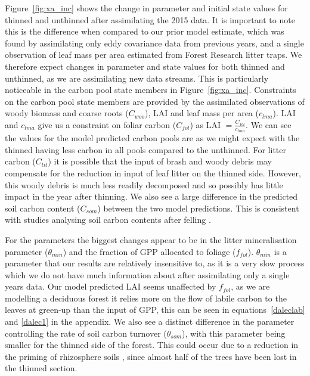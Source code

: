 \documentclass[draft,linenumbers]{agujournal}
\begin{document}
Figure~\ref{fig:xa_inc} shows the change in parameter and initial state values for thinned and unthinned after assimilating the 2015 data. It is important to note this is the difference when compared to our prior model estimate, which was found by assimilating only eddy covariance data from previous years, and a single observation of leaf mass per area estimated from Forest Research litter traps. We therefore expect changes in parameter and state values for both thinned and unthinned, as we are assimilating new data streams. This is particularly noticeable in the carbon pool state members in Figure~\ref{fig:xa_inc}. Constraints on the carbon pool state members are provided by the assimilated observations of woody biomass and coarse roots (\(C_{woo}\)), LAI and leaf mass per area (\(c_{lma}\)). LAI and \(c_{lma}\) give us a constraint on foliar carbon (\(C_{fol}\)) as LAI \(= \frac{C_{fol}}{c_{lma}} \). We can see the values for the model predicted carbon pools are as we might expect with the thinned having less carbon in all pools compared to the unthinned. For litter carbon (\(C_{lit}\)) it is possible that the input of brash and woody debris may compensate for the reduction in input of leaf litter on the thinned side. However, this woody debris is much less readily decomposed and so possibly has little impact in the year after thinning. We also see a large difference in the predicted soil carbon content (\(C_{som}\)) between the two model predictions. This is consistent with studies analysing soil carbon contents after felling \citep{Hernesmaa2005777}. 

For the parameters the biggest changes appear to be in the litter mineralisation parameter (\(\theta_{min}\)) and the fraction of GPP allocated to foliage (\(f_{fol}\)). \(\theta_{min}\) is a parameter that our results are relatively insensitive to, as it is a very slow process which we do not have much information about after assimilating only a single years data. Our model predicted LAI seems unaffected by \(f_{fol}\), as we are modelling a deciduous forest it relies more on the flow of labile carbon to the leaves at green-up than the input of GPP, this can be seen in equations~\eqref{daleclab} and \eqref{dalec1} in the appendix. We also see a distinct difference in the parameter controlling the rate of soil carbon turnover (\(\theta_{som}\)), with this parameter being smaller for the thinned side of the forest. This could occur due to a reduction in the priming of rhizosphere soils \citep{ELE:ELE1095}, since almost half of the trees have been lost in the thinned section.
\end{document}
